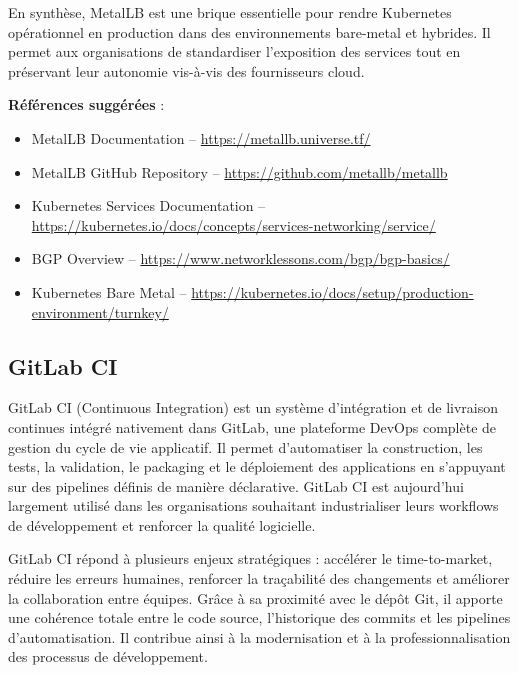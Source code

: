 En synthèse, MetalLB est une brique essentielle pour rendre Kubernetes opérationnel en production dans des environnements bare-metal et hybrides. Il permet aux organisations de standardiser l’exposition des services tout en préservant leur autonomie vis-à-vis des fournisseurs cloud.

\textbf{Références suggérées} :
\begin{itemize}
	\item MetalLB Documentation – \url{https://metallb.universe.tf/}
	\item MetalLB GitHub Repository – \url{https://github.com/metallb/metallb}
	\item Kubernetes Services Documentation – \url{https://kubernetes.io/docs/concepts/services-networking/service/}
	\item BGP Overview – \url{https://www.networklessons.com/bgp/bgp-basics/}
	\item Kubernetes Bare Metal – \url{https://kubernetes.io/docs/setup/production-environment/turnkey/}
\end{itemize}

\subsection{GitLab CI}

GitLab CI (Continuous Integration) est un système d’intégration et de livraison continues intégré nativement dans GitLab, une plateforme DevOps complète de gestion du cycle de vie applicatif. Il permet d’automatiser la construction, les tests, la validation, le packaging et le déploiement des applications en s’appuyant sur des pipelines définis de manière déclarative. GitLab CI est aujourd’hui largement utilisé dans les organisations souhaitant industrialiser leurs workflows de développement et renforcer la qualité logicielle.

 GitLab CI répond à plusieurs enjeux stratégiques  : accélérer le time-to-market, réduire les erreurs humaines, renforcer la traçabilité des changements et améliorer la collaboration entre équipes. Grâce à sa proximité avec le dépôt Git, il apporte une cohérence totale entre le code source, l’historique des commits et les pipelines d’automatisation. Il contribue ainsi à la modernisation et à la professionnalisation des processus de développement.

